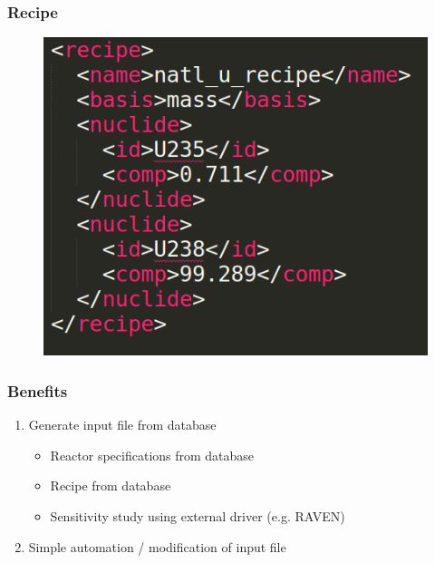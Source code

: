 \begin{frame}
    \frametitle{Recipe}
\begin{figure}[htbp!]
        \begin{center}
                \includegraphics[width=.8\textwidth]{./images/recipe.png}
        \end{center}
    \end{figure}
\end{frame}


\begin{frame}
    \frametitle{Benefits}
    \begin{enumerate}
        \item Generate input file from database
        \begin{itemize}
            \item Reactor specifications from database
            \item Recipe from database
            \item Sensitivity study using external driver (e.g. RAVEN)
        \end{itemize}
        \item Simple automation / modification of input file
    \end{enumerate}
\end{frame}

